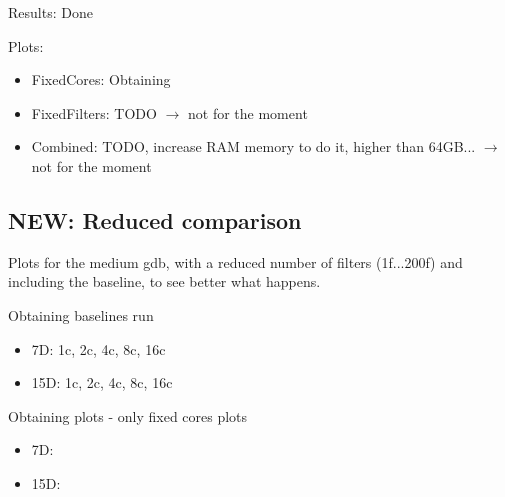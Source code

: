 \documentclass[12pt,a4paper]{article}
\begin{document}
Results: Done

Plots:
\begin{itemize}
    \item FixedCores: Obtaining
    \item FixedFilters: TODO $\rightarrow$ not for the moment
    \item Combined: TODO, increase RAM memory to do it, higher than 64GB... $\rightarrow$ not for the moment
\end{itemize}


\subsection{NEW: Reduced comparison}

Plots for the medium gdb, with a reduced number of filters (1f...200f) and including the baseline, to see better what happens.

Obtaining baselines run
\begin{itemize}
    \item 7D: 1c, 2c, 4c, 8c, 16c
    \item 15D: 1c, 2c, 4c, 8c, 16c
\end{itemize}

Obtaining plots - only fixed cores plots
\begin{itemize}
    \item 7D: 
    \item 15D: 
\end{itemize}
\end{document}
